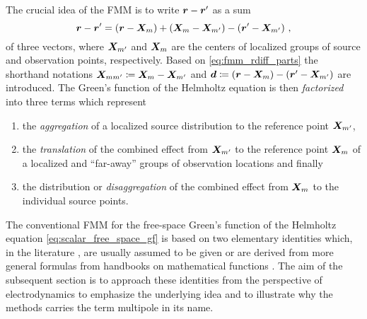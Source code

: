 The crucial idea of the \ac{FMM} is to write $\rdiff$ as a sum
\begin{equation}\label{eq:fmm_rdiff_parts}
	\rdiff =
	\left( \robs - \fmmObsGroupCenter              \right) +
	\left( \fmmObsGroupCenter - \fmmSrcGroupCenter \right) -
	\left( \rsrc - \fmmSrcGroupCenter              \right) \, ,
\end{equation}
of three vectors, where $\fmmSrcGroupCenter$ and $\fmmObsGroupCenter$ are the
centers of localized groups of source and observation points, respectively.
Based on \eqref{eq:fmm_rdiff_parts} the shorthand notations 
$\fmmDiffGroupCenters \coloneqq \fmmObsGroupCenter - \fmmSrcGroupCenter$
and 
$\pvec{d} \coloneqq \left( \robs - \fmmObsGroupCenter \right) - \left( \rsrc - \fmmSrcGroupCenter \right)$
are introduced.
The Green's function of the Helmholtz equation is then \emph{factorized} into
three terms which represent
\begin{enumerate}
	\item the \emph{aggregation} of a localized source distribution to the
	reference point $\fmmSrcGroupCenter$, 
	\item the \emph{translation} of the combined effect from
	$\fmmSrcGroupCenter$ to the reference point $\fmmObsGroupCenter$ of a
	localized and \enquote{far-away} groups of observation locations
	and finally
	\item the distribution or \emph{disaggregation} of the combined effect from
	$\fmmObsGroupCenter$ to the individual source points.
\end{enumerate}

The conventional \ac{FMM} for the free-space Green's function
of the Helmholtz equation \eqref{eq:scalar_free_space_gf} is based on two
elementary identities which, in the literature \cite{Rokhlin1993,Coifman1993},
are usually assumed to be given or are derived from more general formulas from
handbooks on mathematical functions \cite{Abramowitz2014,Abramowitz2014}.
The aim of the subsequent section is to approach these identities from
the perspective of electrodynamics to emphasize the underlying idea and to
illustrate why the methods carries the term multipole in its name.

